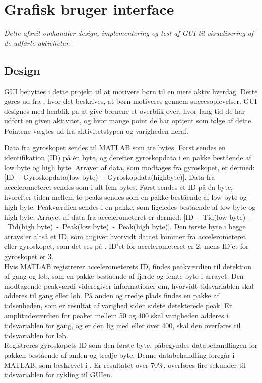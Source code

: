 \section{Grafisk bruger interface}\label{GUI_design}
\textit{Dette afsnit omhandler design, implementering og test af GUI til visualisering af de udførte aktiviteter.}

\subsection{Design}
GUI benyttes i dette projekt til at motivere børn til en mere aktiv hverdag. Dette gøres ud fra , hvor det beskrives, at børn motiveres gennem succesoplevelser. GUI designes med henblik på at give børnene et overblik over, hvor lang tid de har udført en given aktivitet, og hvor mange point de har optjent som følge af dette. Pointene vægtes ud fra aktivitetstypen og varigheden heraf.

Data fra gyroskopet sendes til MATLAB som tre bytes. Først sendes en identifikation (ID) på én byte, og derefter gyroskopdata i en pakke bestående af low byte og high byte. Arrayet af data, som modtages fra gyroskopet, er dermed: [ID~-~Gyroskopdata(low byte)~-~Gyroskopdata(highbyte)]. Data fra accelerometeret sendes som i alt fem bytes. Først sendes et ID på én byte, hvorefter tiden mellem to peaks sendes som en pakke bestående af low byte og high byte. Peakværdien sendes i en pakke, som ligeledes bestående af low byte og high byte. Arrayet af data fra accelerometeret er dermed: [ID~-~Tid(low byte)~-~Tid(high byte)~-~Peak(low byte)~-~Peak(high byte)]. Den første byte i begge arrays er altså et ID, som angiver hvorvidt dataet kommer fra accelerometeret eller gyroskopet, som det ses på . ID'et for accelerometeret er 2, mens ID'et for gyroskopet er 3.\\
Hvis MATLAB registrerer accelerometerets ID, findes peakværdien til detektion af gang og løb, som en pakke bestående af fjerde og femte byte i arrayet. Den modtagende peakværdi videregiver informationer om, hvorvidt tidsvariablen skal adderes til gang eller løb. På anden og tredje plads findes en pakke af tidsenheden, som er resultat af varighed siden sidste detekterede peak. Er amplitudeværdien for peaket mellem 50 og 400 skal varigheden adderes i tidsvariablen for gang, og er den lig med eller over 400, skal den overføres til tidsvariablen for løb.\\
Registreres gyroskopets ID som den første byte, påbegyndes databehandlingen for pakken bestående af anden og tredje byte. Denne databehandling foregår i MATLAB, som beskrevet i . Er resultatet over 70\%, overføres fire sekunder til tidsvariablen for cykling til GUIen.

